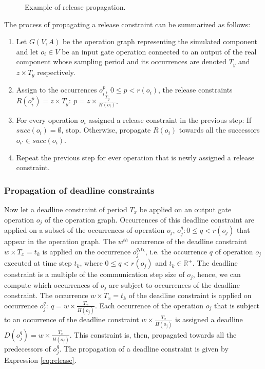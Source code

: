 \begin{figure}[phbt]
\centering

\caption{Example of release propagation.}
\label{fig:rpropagation}
\end{figure}

The process of propagating a release constraint can be summarized as follows:

\begin{enumerate}
\item Let $G(V,A)$ be the operation graph representing the simulated component and let $o_i \in  V$ be an input gate operation connected to an output of the real component whose sampling period and its occurrences are denoted $T_y$ and $z \times T_y$ respectively.
\item Assign to the occurrences $o_i^p,\ 0 \leq p < r(o_i)$, the release constraints $R(o_i^p) = z \times T_y:\ p = z \times \frac{T_y}{H(o_i)}$.
\item For every operation $o_i$ assigned a release constraint in the previous step: If $succ(o_i) = \emptyset$, stop. Otherwise, propagate $R(o_i)$ towards all the successors $o_{i'} \in succ(o_i)$.
\item Repeat the previous step for ever operation that is newly assigned a release constraint.
\end{enumerate}

\subsubsection{Propagation of deadline constraints}

Now let a deadline constraint of period $T_x$ be applied on an output gate operation $o_j$ of the operation graph. Occurrences of this deadline constraint are applied on a subset of the occurrences of operation $o_j$, $o_j^q: 0 \leq q < r(o_j)$ that appear in the operation graph. The $w^{th}$ occurrence of the deadline constraint $w \times T_x = t_k$ is applied on the occurrence $o^{q,t_k}_j $, i.e. the occurrence $q$ of operation $o_j$ executed at time step $t_k$, where $0 \leq q < r(o_j)$ and $t_k \in \mathbb{R}^+$. The deadline constraint is a multiple of the communication step size of $o_j$, hence, we can compute which occurrences of $o_j$ are subject to occurrences of the deadline constraint. The occurrence $w \times T_x = t_k$ of the deadline constraint is applied on occurrence $o_j^q:\ q = w \times \frac{T_x}{H(o_j)}$. Each occurrence of the operation $o_j$ that is subject to an occurrence of the deadline constraint $w \times \frac{T_x}{H(o_j)}$ is assigned a deadline $D(o_j^q) = w \times \frac{T_x}{H(o_j)}$. This constraint is, then, propagated towards all the predecessors of $o_j^q$. The propagation of a deadline constraint is given by Expression \ref{eq:release}.

